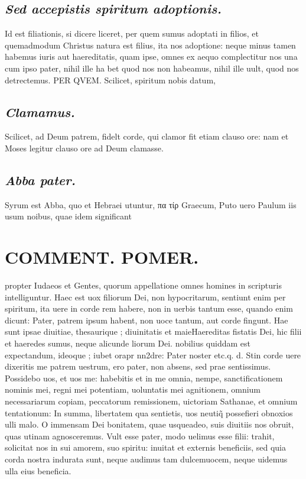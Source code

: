 \documentclass{article}
\begin{document}
\begin{pages}
\subsection*{\textit{Sed accepistis spiritum adoptionis. }}\pstart Id est filiationis, si dicere liceret, per quem sumus adoptati in filios, et quemadmodum Christus natura est filius, ita nos adoptione: neque minus tamen habemus iuris aut haereditatis, quam ipse, omnes ex aequo complectitur nos una cum ipso pater, nihil ille ha bet quod nos non habeamus, nihil ille uult, quod nos detrectemus. PER QVEM. Scilicet, spiritum nobis datum,  \pend
{}
{}
\subsection*{\textit{Clamamus. }}\pstart Scilicet, ad Deum patrem, fidelt corde, qui clamor fit etiam clauso ore: nam et Moses legitur clauso ore ad Deum clamasse.  \pend
{}
{}
\subsection*{\textit{Abba pater. }}\pstart Syrum est Abba, quo et Hebraei utuntur, πα τίρ Graecum, Puto uero Paulum iis usum noibus, quae idem significant  \pend
\section*{COMMENT. POMER.  }\pstart propter Iudaeos et Gentes, quorum appellatione omnes homines in scripturis intelliguntur. Haec est uox filiorum Dei, non hypocritarum, sentiunt enim per spiritum, ita uere in corde rem habere, non in uerbis tantum esse, quando enim dicunt: Pater, patrem ipsum habent, non uoce tantum, aut corde fingunt. Hae sunt ipsae diuitiae, thesaurique ; diuinitatis et maieHaereditas fistatis Dei, hic filii et haeredes sumus, neque alicunde liorum Dei. nobilius quiddam est expectandum, ideoque ; iubet orapr nn2dre: Pater noster etc.q. d. Stin corde uere dixeritis me patrem uestrum, ero pater, non absens, sed prae sentissimus. Possidebo uos, et uos me: habebitis et in me omnia, nempe, sanctificationem nominis mei, regni mei potentiam, uoluntatis mei agnitionem, omnium necessariarum copiam, peccatorum remissionem, uictoriam Sathanae, et omnium tentationum: In summa, libertatem qua sentietis, uos neutiq̃ possefieri obnoxios ulli malo. O immensam Dei bonitatem, quae usqueadeo, suis diuitiis nos obruit, quas utinam agnosceremus. Vult esse pater, modo uelimus esse filii: trahit, solicitat nos in sui amorem, suo spiritu: inuitat et externis beneficiis, sed quia corda nostra indurata sunt, neque audimus tam dulcemuocem, neque  uidemus ulla eius beneficia.   \pend
{}
{}

\end{pages}
\end{document}
